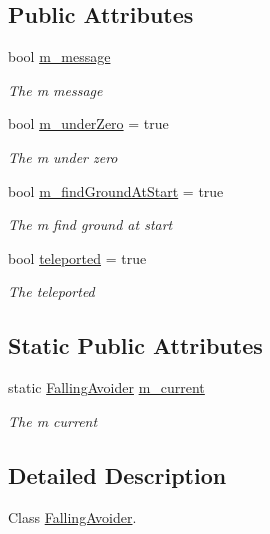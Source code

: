 \subsection*{Public Attributes}
\begin{DoxyCompactItemize}
\item 
bool \hyperlink{class_falling_avoider_ae8ae1e0291ba2f7f622c94e61513d4a5}{m\+\_\+message}
\begin{DoxyCompactList}\small\item\em The m message \end{DoxyCompactList}\item 
bool \hyperlink{class_falling_avoider_a993d73f587e2ce4c402e0878b93e9805}{m\+\_\+under\+Zero} = true
\begin{DoxyCompactList}\small\item\em The m under zero \end{DoxyCompactList}\item 
bool \hyperlink{class_falling_avoider_a8b3cbdb25daa0eb1336fd607a1cd69d5}{m\+\_\+find\+Ground\+At\+Start} = true
\begin{DoxyCompactList}\small\item\em The m find ground at start \end{DoxyCompactList}\item 
bool \hyperlink{class_falling_avoider_a066a8a82082a64250b2518d65328fc39}{teleported} = true
\begin{DoxyCompactList}\small\item\em The teleported \end{DoxyCompactList}\end{DoxyCompactItemize}
\subsection*{Static Public Attributes}
\begin{DoxyCompactItemize}
\item 
static \hyperlink{class_falling_avoider}{Falling\+Avoider} \hyperlink{class_falling_avoider_aefc03633515d8eb72a77c954a55d7999}{m\+\_\+current}
\begin{DoxyCompactList}\small\item\em The m current \end{DoxyCompactList}\end{DoxyCompactItemize}


\subsection{Detailed Description}
Class \hyperlink{class_falling_avoider}{Falling\+Avoider}. 



